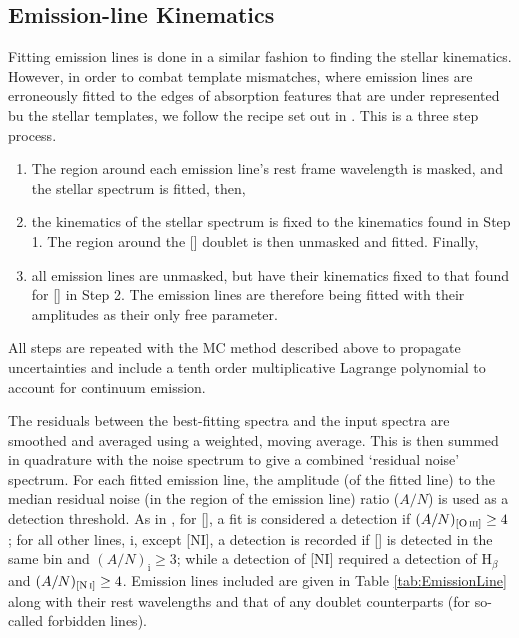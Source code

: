 	\subsection{Emission-line Kinematics}
		\label{subsec:EmissionFit}
		Fitting emission lines is done in a similar fashion to finding the stellar kinematics. However, in order to combat template mismatches, where emission lines are erroneously fitted to the edges of absorption features that are under represented bu the stellar templates, we follow the recipe set out in \citet{Sarzi2005}. This is a three step process.
		\begin{enumerate}
			\item The region around each emission line's rest frame wavelength is masked, and the stellar spectrum is fitted, then,
			\item the kinematics of the stellar spectrum is fixed to the kinematics found in Step 1. The region around the [] doublet is then unmasked and fitted. Finally, 
			\item all emission lines are unmasked, but have their kinematics fixed to that found for [] in Step 2. The emission lines are therefore being fitted with their amplitudes as their only free parameter. 
		\end{enumerate}
		All steps are repeated with the MC method described above to propagate uncertainties and include a tenth order multiplicative Lagrange polynomial to account for continuum emission. 

		The residuals between the best-fitting spectra and the input spectra are smoothed and averaged using a weighted, moving average. This is then summed in quadrature with the noise spectrum to give a combined `residual noise' spectrum. For each fitted emission line, the amplitude (of the fitted line) to the median residual noise (in the region of the emission line) ratio ($A/N$) is used as a detection threshold. As in \citet{Sarzi2005}, for [], a fit is considered a detection if $(A/N)_{[\text{\ion{O}{iii}}]} \ge 4$; for all other lines, i, except [NI], a detection is recorded if [] is detected in the same bin and $(A/N)_\mathrm{i} \ge 3$; while a detection of [NI] required a detection of H$_\beta$ and $(A/N)_{[\text{\ion{N}{i}}]} \ge 4$. Emission lines included are given in Table \ref{tab:EmissionLine} along with their rest wavelengths and that of any doublet counterparts (for so-called forbidden lines). 

